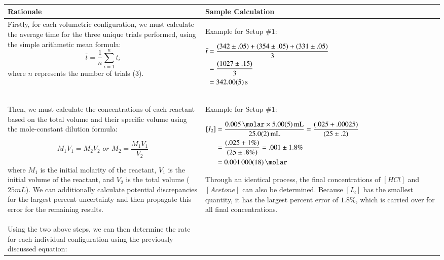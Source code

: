 \begin{table}[H]
\centering

\begin{tabularx}{\textwidth}{|X|X|}
\hline 
 Rationale & Sample Calculation\\
 \hline
	Firstly, for each volumetric configuration, we must calculate the average time for the three unique trials performed, using the simple arithmetic mean formula:
	\[\bar{t}={\frac {1}{n}}\sum _{i=1}^{n}t_{i}\]
	where $n$ represents the number of trials ($3$).	
	& 
	Example for Setup $\# 1$: \newline

	{$\!\begin{aligned}
	\bar{t} &= \frac{(342 \pm .05) + (354 \pm .05) + (331 \pm .05)}{3} \\
	&= \frac{(1027 \pm .15)}{3} \\
	&= \SI{342 \pm .05}{\second}
	\end{aligned}$} \\
  \hline
Then, we must calculate the concentrations of each reactant based on the total volume and their specific volume using the mole-constant dilution formula:

\[M_1V_1 = M_2V_2 \textit{ or } M_2 = \frac{M_1V_1}{V_2} \]

where $M_1$ is the initial molarity of the reactant, $V_1$ is the initial volume of the reactant, and $V_2$ is the total volume ($25 mL$). We can additionally calculate potential discrepancies for the largest percent uncertainty and then propagate this error for the remaining results.
	& 
	Example for Setup $\# 1$: \newline

	{$\!\begin{aligned}
	\left[I_2\right] &= \frac{\SI{.005}{\molar} \times \SI{5 \pm .05}{\milli\liter}}{\SI{25 \pm .2}{\milli\liter}} = \frac{(.025 + .00025)}{(25 \pm .2)} \\
	&= \frac{(.025 + 1\%)}{(25 \pm .8\%)} = .001 \pm 1.8\% \\
	&= \SI{.001 \pm .000018}{\molar} 
	\end{aligned}$} 

Through an identical process, the final concentrations of $[HCl]$ and $[Acetone]$ can also be determined. Because $[I_2]$ has the smallest quantity, it has the largest percent error of $1.8\%$, which is carried over for all final concentrations. \\
\hline

Using the two above steps, we can then determine the rate for each individual configuration using the previously discussed equation:


\end{tabularx}
\end{table}
